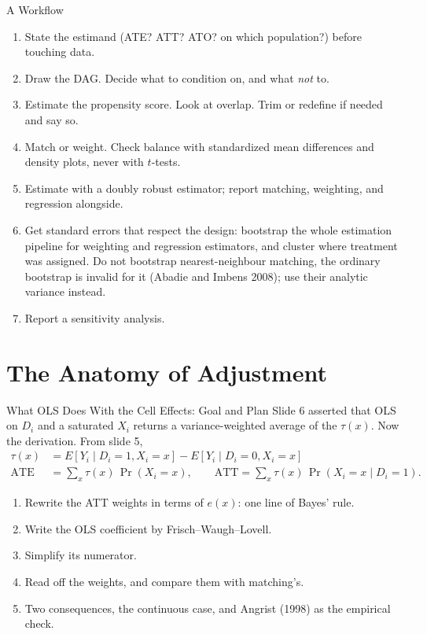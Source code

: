 \documentclass[aspectratio=169,11pt,xcolor=dvipsnames]{beamer}
\newcommand{\srcp}[1]{{\scriptsize\color{gray}(#1)}}
\newcommand{\E}{E}
\newcommand{\core}{\,\raisebox{0.6pt}{\textcolor{corestar}{$\bigstar$}}}
\begin{document}
\begin{frame}{A Workflow\core}
\begin{enumerate}\itemsep2pt
  \item State the estimand (ATE? ATT? ATO? on which population?) before touching
        data.
  \item Draw the DAG. Decide what to condition on, and what \emph{not} to.
  \item Estimate the propensity score. Look at overlap. Trim or redefine if needed
        and say so.
  \item Match or weight. Check balance with standardized mean differences and
        density plots, \alert{never} with $t$-tests.
  \item Estimate with a doubly robust estimator; report matching, weighting, and
        regression alongside.
  \item Get standard errors that respect the design: bootstrap the whole
        estimation pipeline for weighting and regression estimators, and cluster
        where treatment was assigned. \alert{Do not bootstrap nearest-neighbour
        matching}, the ordinary bootstrap is invalid for it
        \srcp{Abadie and Imbens 2008}; use their analytic variance instead.
  \item Report a sensitivity analysis.
\end{enumerate}
\end{frame}

\section[Anatomy]{The Anatomy of Adjustment}
\begin{frame}\sectionpage\end{frame}

\begin{frame}{What OLS Does With the Cell Effects: Goal and Plan}
Slide 6 asserted that OLS on $D_i$ and a saturated $X_i$ returns a
variance-weighted average of the $\tau(x)$. Now the derivation. From slide 5,
\begin{align*}
  \tau(x) &= \E[Y_i\mid D_i = 1,X_i = x] - \E[Y_i\mid D_i = 0,X_i = x] \\
  \text{ATE} &= \textstyle\sum_x \tau(x)\,\Pr(X_i = x), \qquad
  \text{ATT} = \textstyle\sum_x \tau(x)\,\Pr(X_i = x \mid D_i = 1) .
\end{align*}
\begin{enumerate}\itemsep2pt
  \item Rewrite the ATT weights in terms of $e(x)$: one line of Bayes' rule.
  \item Write the OLS coefficient by Frisch--Waugh--Lovell.
  \item Simplify its numerator.
  \item Read off the weights, and compare them with matching's.
  \item Two consequences, the continuous case, and Angrist (1998) as the
        empirical check.
\end{enumerate}
\end{frame}
\end{document}
